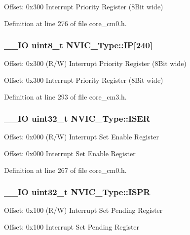 Offset\-: 0x300 Interrupt Priority Register (8\-Bit wide) 

Definition at line 276 of file core\-\_\-cm0.\-h.

\hypertarget{struct_n_v_i_c___type_a6524789fedb94623822c3e0a47f3d06c}{
\subsubsection[{I\-P}]{\setlength{\rightskip}{0pt plus 5cm}\-\_\-\-\_\-\-I\-O {\bf uint8\-\_\-t} N\-V\-I\-C\-\_\-\-Type\-::\-I\-P\mbox{[}240\mbox{]}}}\label{struct_n_v_i_c___type_a6524789fedb94623822c3e0a47f3d06c}
Offset\-: 0x300 (R/\-W) Interrupt Priority Register (8\-Bit wide)

Offset\-: 0x300 Interrupt Priority Register (8\-Bit wide) 

Definition at line 293 of file core\-\_\-cm3.\-h.

\hypertarget{struct_n_v_i_c___type_aaff305f50a7117272e5523ec17cff9ec}{
\subsubsection[{I\-S\-E\-R}]{\setlength{\rightskip}{0pt plus 5cm}\-\_\-\-\_\-\-I\-O {\bf uint32\-\_\-t} N\-V\-I\-C\-\_\-\-Type\-::\-I\-S\-E\-R}}\label{struct_n_v_i_c___type_aaff305f50a7117272e5523ec17cff9ec}
Offset\-: 0x000 (R/\-W) Interrupt Set Enable Register

Offset\-: 0x000 Interrupt Set Enable Register 

Definition at line 267 of file core\-\_\-cm0.\-h.

\hypertarget{struct_n_v_i_c___type_aa98673f8401e00b2dc73003a4d747e0b}{
\subsubsection[{I\-S\-P\-R}]{\setlength{\rightskip}{0pt plus 5cm}\-\_\-\-\_\-\-I\-O {\bf uint32\-\_\-t} N\-V\-I\-C\-\_\-\-Type\-::\-I\-S\-P\-R}}\label{struct_n_v_i_c___type_aa98673f8401e00b2dc73003a4d747e0b}
Offset\-: 0x100 (R/\-W) Interrupt Set Pending Register

Offset\-: 0x100 Interrupt Set Pending Register 

